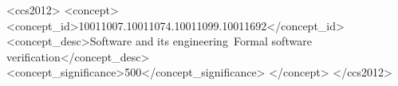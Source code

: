 

\begin{CCSXML}
<ccs2012>
   <concept>
       <concept_id>10011007.10011074.10011099.10011692</concept_id>
       <concept_desc>Software and its engineering~Formal software verification</concept_desc>
       <concept_significance>500</concept_significance>
       </concept>
 </ccs2012>
\end{CCSXML}



